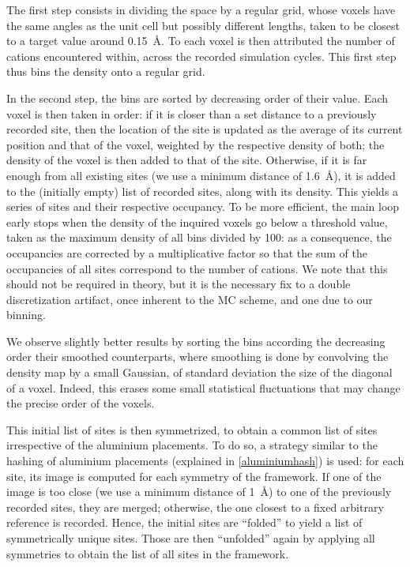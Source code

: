 \documentclass[main.tex]{subfiles}
\begin{document}
The first step consists in dividing the space by a regular grid, whose voxels have the same angles as the unit cell but possibly different lengths, taken to be closest to a target value around \qty{0.15}{\angstrom}. To each voxel is then attributed the number of cations encountered within, across the recorded simulation cycles. This first step thus bins the density onto a regular grid.

In the second step, the bins are sorted by decreasing order of their value. Each voxel is then taken in order: if it is closer than a set distance to a previously recorded site, then the location of the site is updated as the average of its current position and that of the voxel, weighted by the respective density of both; the density of the voxel is then added to that of the site. Otherwise, if it is far enough from all existing sites (we use a minimum distance of \qty{1.6}{\angstrom}), it is added to the (initially empty) list of recorded sites, along with its density. This yields a series of sites and their respective occupancy. To be more efficient, the main loop early stops when the density of the inquired voxels go below a threshold value, taken as the maximum density of all bins divided by 100: as a consequence, the occupancies are corrected by a multiplicative factor so that the sum of the occupancies of all sites correspond to the number of cations. We note that this should not be required in theory, but it is the necessary fix to a double discretization artifact, once inherent to the MC scheme, and one due to our binning.

We observe slightly better results by sorting the bins according the decreasing order their smoothed counterparts, where smoothing is done by convolving the density map by a small Gaussian, of standard deviation the size of the diagonal of a voxel. Indeed, this erases some small statistical fluctuations that may change the precise order of the voxels.

This initial list of sites is then symmetrized, to obtain a common list of sites irrespective of the aluminium placements. To do so, a strategy similar to the hashing of aluminium placements (explained in \cref{aluminiumhash}) is used: for each site, its image is computed for each symmetry of the framework. If one of the image is too close (we use a minimum distance of \qty{1}{\angstrom}) to one of the previously recorded sites, they are merged; otherwise, the one closest to a fixed arbitrary reference is recorded. Hence, the initial sites are ``folded'' to yield a list of symmetrically unique sites. Those are then ``unfolded'' again by applying all symmetries to obtain the list of all sites in the framework.
\end{document}
